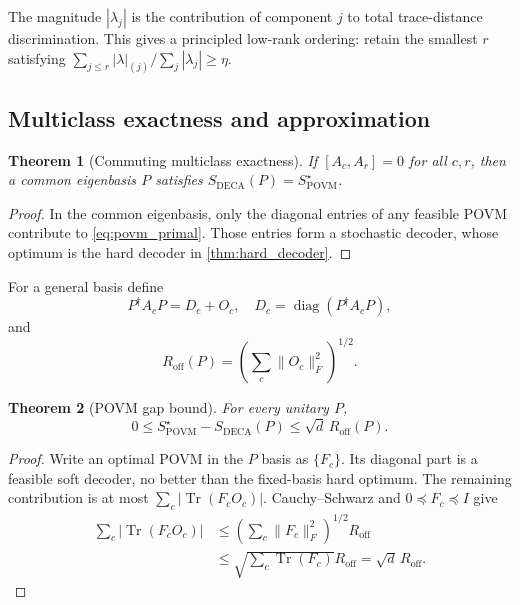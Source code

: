 \documentclass[10pt,twocolumn]{article}
\newtheorem{theorem}{Theorem}
\theoremstyle{definition}
\theoremstyle{remark}
\newcommand{\Tr}{\operatorname{Tr}}
\newcommand{\diag}{\operatorname{diag}}
\begin{document}
The magnitude $|\lambda_j|$ is the contribution of component $j$ to total
trace-distance discrimination.  This gives a principled low-rank ordering:
retain the smallest $r$ satisfying
$\sum_{j\le r}|\lambda|_{(j)}/\sum_j|\lambda_j|\ge\eta$.

\subsection{Multiclass exactness and approximation}

\begin{theorem}[Commuting multiclass exactness]
\label{thm:commuting}
If $[A_c,A_r]=0$ for all $c,r$, then a common eigenbasis $P$ satisfies
$S_{\mathrm{DECA}}(P)=S_{\mathrm{POVM}}^\star$.
\end{theorem}
\begin{proof}
In the common eigenbasis, only the diagonal entries of any feasible POVM
contribute to \cref{eq:povm_primal}.  Those entries form a stochastic decoder,
whose optimum is the hard decoder in \cref{thm:hard_decoder}.
\end{proof}

For a general basis define
\begin{equation}
  P^\dagger A_cP=D_c+O_c,\quad
  D_c=\diag(P^\dagger A_cP),
\end{equation}
and
\begin{equation}
  R_{\mathrm{off}}(P)
  =
  \left(\sum_c\|O_c\|_F^2\right)^{1/2}.
  \label{eq:residual}
\end{equation}

\begin{theorem}[POVM gap bound]
\label{thm:gap}
For every unitary $P$,
\begin{equation}
0\le
S_{\mathrm{POVM}}^\star-S_{\mathrm{DECA}}(P)
\le \sqrt{d}\,R_{\mathrm{off}}(P).
\label{eq:gap_bound}
\end{equation}
\end{theorem}
\begin{proof}
Write an optimal POVM in the $P$ basis as $\{F_c\}$.  Its diagonal part is a
feasible soft decoder, no better than the fixed-basis hard optimum.  The
remaining contribution is at most
$\sum_c|\Tr(F_cO_c)|$.  Cauchy--Schwarz and
$0\preceq F_c\preceq I$ give
\begin{align*}
\sum_c|\Tr(F_cO_c)|
&\le
\left(\sum_c\|F_c\|_F^2\right)^{1/2}
R_{\mathrm{off}}\\
&\le
\sqrt{\sum_c\Tr(F_c)}R_{\mathrm{off}}
=\sqrt d\,R_{\mathrm{off}}.
\end{align*}
\end{proof}
\end{document}
